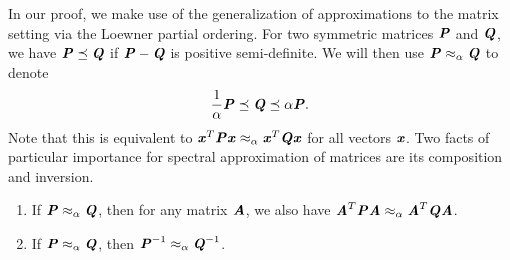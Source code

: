 In our proof, we make use of the generalization of approximations
 to the matrix setting via the Loewner partial ordering.
For two symmetric matrices $\PP$ and $\QQ$, we have $\PP \preceq \QQ$
if $\PP - \QQ$  is positive semi-definite.
We will then use $\PP \approx_{\alpha} \QQ$ to denote
\begin{equation*}
\frac{1}{\alpha} \PP \preceq \QQ \preceq \alpha \PP. 
\end{equation*}
Note that this is equivalent to $\xx^T \PP \xx \approx_{\alpha} \xx^T \QQ \xx$ for
all vectors $\xx$.
Two facts of particular importance for spectral approximation of matrices
are its composition and inversion.
\begin{fact}
\label{fact:operatorApprox}
\begin{enumerate}
\item If $\PP \approx_{\alpha} \QQ$, then for any matrix $\AA$, we also have
$\AA^T \PP \AA \approx_{\alpha} \AA^T \QQ \AA$.
\item If $\PP \approx_{\alpha} \QQ$, then $\PP^{-1} \approx_{\alpha} \QQ^{-1}$.
\end{enumerate}
\end{fact}

